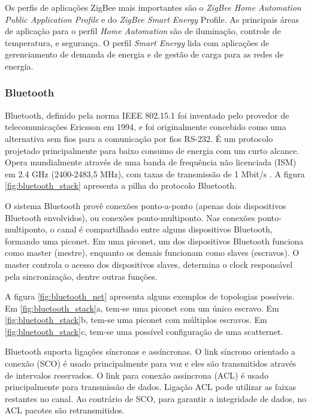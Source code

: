 Os perfis de aplicações ZigBee mais importantes são o \emph{ZigBee
Home Automation Public Application Profile}\cite{alliance2007} e
do \emph{ZigBee Smart Energy} Profile\cite{alliance11smart}. As principais
áreas de aplicação para o perfil \emph{Home Automation} são de iluminação,
controle de temperatura, e segurança. O perfil \emph{Smart Energy}
lida com aplicações de gerenciamento de demanda de energia e de gestão
de carga para as redes de energia.

\subsubsection{Bluetooth}

Bluetooth, definido pela norma IEEE 802.15.1\cite{Bluetooth2004}
foi inventado pelo provedor de telecomunicações Ericsson em 1994,
e foi originalmente concebido como uma alternativa sem fios para a
comunicação por fios RS-232. É um protocolo projetado principalmente
para baixo consumo de energia com um curto alcance. Opera mundialmente
através de uma banda de frequência não licenciada (ISM) em 2.4 GHz
(2400-2483,5 MHz), com taxas de transmissão de 1 Mbit/s \cite{Haartsen:1998}.
A figura \ref{fig:bluetooth_stack} apresenta a pilha do protocolo
Bluetooth.

O sistema Bluetooth provê conexões ponto-a-ponto (apenas dois dispositivos
Bluetooth envolvidos), ou conexões ponto-multiponto. Nas conexões
ponto-multiponto, o canal é compartilhado entre alguns dispositivos
Bluetooth, formando uma piconet. Em uma piconet, um dos dispositivos
Bluetooth funciona como master (mestre), enquanto os demais funcionam
como slaves (escravos). O master controla o acesso dos dispositivos
slaves, determina o clock responsável pela sincronização, dentre outras
funções.

A figura \ref{fig:bluetooth_net} apresenta alguns exemplos de topologias
possíveis. Em \ref{fig:bluetooth_stack}a, tem-se uma piconet com
um único escravo. Em \ref{fig:bluetooth_stack}b, tem-se uma piconet
com múltiplos escravos. Em \ref{fig:bluetooth_stack}c, tem-se uma
possível configuração de uma scatternet\cite{BluetoothSpecv1}.

Bluetooth suporta ligações síncronas e assíncronas. O link síncrono
orientado a conexão (SCO) é usado principalmente para voz e eles são
transmitidos através de intervalos reservados. O link para conexão
assíncrona (ACL) é usado principalmente para transmissão de dados.
Ligação ACL pode utilizar as faixas restantes no canal. Ao contrário
de SCO, para garantir a integridade de dados, no ACL pacotes são retransmitidos.


